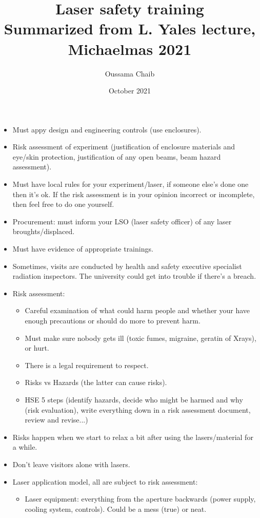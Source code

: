 \documentclass[a4paper,11pt]{article}
\title{%
	Laser safety training \\
	\vspace{10pt}
	\small Summarized from L. Yales lecture, Michaelmas 2021}
\author{\small Oussama Chaib}
\date{\small October 2021}
\begin{document}
	\maketitle
	\begin{itemize}
		\item Must appy design and engineering controls (use enclosures).
		\item Risk assessment of experiment (justification of enclosure materials and eye/skin protection, justification of any open beams, beam hazard assessment).
		\item Must have local rules for your experiment/laser, if someone else's done one then it's ok. If the risk assessment is in your opinion incorrect or incomplete, then feel free to do one yourself.
		\item Procurement: must inform your LSO (laser safety officer) of any laser broughts/displaced.
		\item Must have evidence of appropriate trainings.
		\item Sometimes, visits are conducted by health and safety executive specialist radiation inspectors. The university could get into trouble if there's a breach.
		\item Risk assessment:
		\begin{itemize}
			\item Careful examination of what could harm people and whether your have enough precautions or should do more to prevent harm.
			\item Must make sure nobody gets ill (toxic fumes, migraine, geratin of Xrays), or hurt.
			\item There is a legal requirement to respect.
			\item Risks vs Hazards (the latter can cause risks).
			\item HSE 5 steps (identify hazards, decide who might be harmed and why (risk evaluation), write everything down in a risk assessment document, review and revise...)
		\end{itemize}
	\item Risks happen when we start to relax a bit after using the lasers/material for a while.
	\item Don't leave visitors alone with lasers.
	\item Laser application model, all are subject to risk assessment:
	\begin{itemize}
		\item Laser equipment: everything from the aperture backwards (power supply, cooling system, controls). Could be a mess (true) or neat.

\end{itemize}
\end{itemize}
\end{document}
